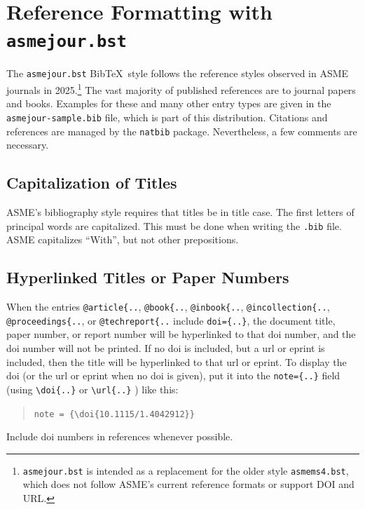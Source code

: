 \documentclass[balance,nocopyright,upint,varvw,hyphenate,barcolor=Goldenrod3,german]{asmejour}%
\newcommand*\BibTeX{Bib\TeX}
\begin{document}


\section{Reference Formatting with \texttt{asmejour.bst}}

The {\upshape\texttt{asmejour.bst}} \BibTeX\ style follows the reference styles observed in ASME journals in 2025.\footnote{\texttt{asmejour.bst} is intended as a replacement for the older style \texttt{asmems4.bst}, which does not follow ASME's current reference formats or support DOI and URL.} The vast majority of published references are to journal papers and books. Examples for these and many other entry types are given in the \texttt{asmejour-sample.bib} file, which is part of this distribution. Citations and references are managed by the \texttt{natbib} package.
Nevertheless, a few comments are necessary.

\subsection{Capitalization of Titles} ASME's bibliography style requires that titles be in title case. The first letters of principal words are capitalized. This must be done when writing the \texttt{.bib} file.
ASME capitalizes ``With'', but not other prepositions.

\subsection{Hyperlinked Titles or Paper Numbers} When the entries \verb|@article{..|, \verb|@book{..|, \verb|@inbook{..|, \verb|@incollection{..|, \verb|@proceedings{..|, or \verb|@techreport{..| include \verb|doi={..}|, the document title, paper number, or report number will be hyperlinked to that doi number, and the doi number will not be printed. If no doi is included, but a url or eprint is included, then the title will be hyperlinked to that url or eprint. To display the doi (or the url or eprint when no doi is given), put it into the \verb|note={..}| field (using \verb|\doi{..}| or \verb|\url{..}| ) like this:
\begin{quote}
\verb|note = {\doi{10.1115/1.4042912}}|
\end{quote}
Include doi numbers in references whenever possible.
\end{document}
